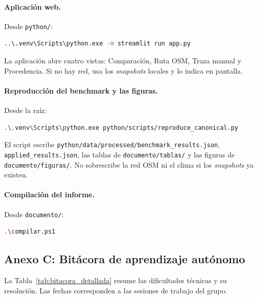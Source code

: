 \paragraph{Aplicación web.} Desde \texttt{python/}:
\begin{lstlisting}[language=bash, caption={Ejecución de la aplicación Streamlit}]
..\.venv\Scripts\python.exe -m streamlit run app.py
\end{lstlisting}
La aplicación abre cuatro vistas: Comparación, Ruta OSM, Traza manual y Procedencia. Si no hay red, usa los \textit{snapshots} locales y lo indica en pantalla.

\paragraph{Reproducción del benchmark y las figuras.} Desde la raíz:
\begin{lstlisting}[language=bash, caption={Regeneración de resultados, tablas y figuras}]
.\.venv\Scripts\python.exe python/scripts/reproduce_canonical.py
\end{lstlisting}
El script escribe \texttt{python/data/processed/benchmark\_results.json}, \texttt{applied\_results.json}, las tablas de \texttt{documento/tablas/} y las figuras de \texttt{documento/figuras/}. No sobrescribe la red OSM ni el clima si los \textit{snapshots} ya existen.

\paragraph{Compilación del informe.} Desde \texttt{documento/}:
\begin{lstlisting}[language=bash, caption={Compilación con pdflatex y biber}]
.\compilar.ps1
\end{lstlisting}

\subsection*{Anexo C: Bitácora de aprendizaje autónomo}
\label{anexo:bitacora}
La Tabla~\ref{tab:bitacora_detallada} resume las dificultades técnicas y su resolución. Las fechas corresponden a las sesiones de trabajo del grupo.

